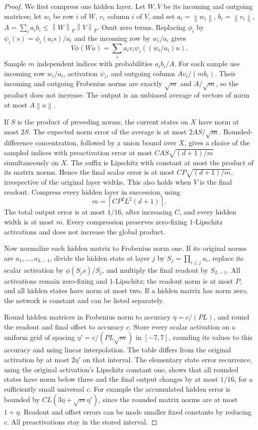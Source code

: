 \documentclass[11pt]{article}
\theoremstyle{remark}\newtheorem{remark}[theorem]{Remark}
\newcommand{\norm}[1]{\left\lVert #1\right\rVert}
\begin{document}
\begin{proof}
We first compress one hidden layer. Let $W,V$ be its incoming and outgoing
matrices; let $w_i$ be row $i$ of $W$, $v_i$ column $i$ of $V$, and set
$a_i=\norm{w_i}$, $b_i=\norm{v_i}$,
$A=\sum_i a_i b_i\le\norm W_F\norm V_F$. Omit zero terms. Replacing
$\phi_i$ by $\psi_i(s)=\phi_i(a_i s)/a_i$ and the incoming row by
$w_i/a_i$ gives
\[
 V\phi(Wu)=\sum_i a_i v_i\psi_i((w_i/a_i)u).
\]
Sample $m$ independent indices with probabilities $a_i b_i/A$. For each
sample use incoming row $w_i/a_i$, activation $\psi_i$, and outgoing column
$A v_i/(m b_i)$. Their incoming and outgoing Frobenius norms are exactly
$\sqrt m$ and $A/\sqrt m$, so the product does not increase. The output
is an unbiased average of vectors of norm at most $A\norm u$.

If $S$ is the product of preceding norms, the current states on $X$ have
norm at most $2S$. The expected norm error of the average is at most
$2AS/\sqrt m$. Bounded-difference concentration, followed by a union bound
over $X$, gives a choice of the sampled indices with preactivation error
at most $C AS\sqrt{(d+1)/m}$ simultaneously on $X$. The suffix is
Lipschitz with constant at most the product of its matrix norms. Hence
the final scalar error is at most $C P\sqrt{(d+1)/m}$, irrespective of
the original layer widths. This also holds when $V$ is the final readout.
Compress every hidden layer in succession, using
\[
 m=\left\lceil C P^2L^2(d+1)\right\rceil.
\]
The total output error is at most $1/16$, after increasing $C$, and every
hidden width is at most $m$. Every compression preserves zero-fixing
$1$-Lipschitz activations and does not increase the global product.

Now normalize each hidden matrix to Frobenius norm one. If its original
norms are $a_1,\ldots,a_{L-1}$, divide the hidden state at layer $j$ by
$S_j=\prod_{i\le j}a_i$, replace its scalar activation by
$\phi(S_j s)/S_j$, and multiply the final readout by $S_{L-1}$.
All activations remain zero-fixing and $1$-Lipschitz; the readout norm is
at most $P$, and all hidden states have norm at most two. If a hidden
matrix has norm zero, the network is constant and can be listed separately.

Round hidden matrices in Frobenius norm to accuracy
$\eta=c/(PL)$, and round the readout and final offset to accuracy $c$.
Store every scalar activation on a uniform grid of spacing
$\eta'=c/(PL\sqrt m)$ in $[-7,7]$, rounding its values to this accuracy
and using linear interpolation. The table differs from the original
activation by at most $2\eta'$ on that interval. The elementary state
error recurrence, using the original activation's Lipschitz constant one,
shows that all rounded states have norm below three and the final output
changes by at most $1/16$, for a sufficiently small universal $c$.
For example the accumulated hidden error is bounded by
$C L(3\eta+\sqrt m\eta')$, since the rounded matrix norms are at most
$1+\eta$. Readout and offset errors can be made smaller fixed constants
by reducing $c$. All preactivations stay in the stored interval.


\end{proof}
\end{document}
